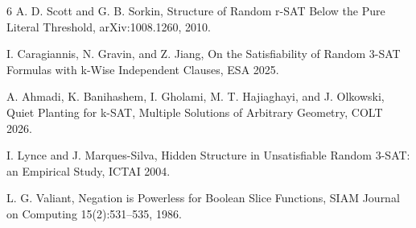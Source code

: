 \documentclass[11pt]{article}
\begin{document}
\begin{thebibliography}{6}
A. D. Scott and G. B. Sorkin,
Structure of Random r-SAT Below the Pure Literal Threshold,
arXiv:1008.1260, 2010.

I. Caragiannis, N. Gravin, and Z. Jiang,
On the Satisfiability of Random 3-SAT Formulas with k-Wise Independent Clauses,
ESA 2025.

A. Ahmadi, K. Banihashem, I. Gholami, M. T. Hajiaghayi, and J. Olkowski,
Quiet Planting for k-SAT, Multiple Solutions of Arbitrary Geometry,
COLT 2026.

I. Lynce and J. Marques-Silva,
Hidden Structure in Unsatisfiable Random 3-SAT: an Empirical Study,
ICTAI 2004.

L. G. Valiant,
Negation is Powerless for Boolean Slice Functions,
SIAM Journal on Computing 15(2):531--535, 1986.
\end{thebibliography}
\end{document}
